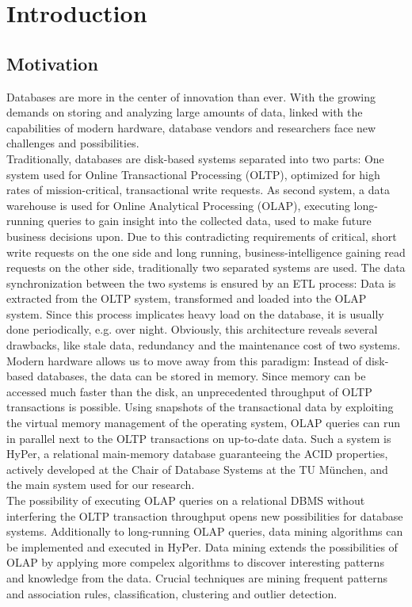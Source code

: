 \chapter{Introduction}\label{chapter:introduction}

\section{Motivation}


Databases are more in the center of innovation than ever. With the growing demands on storing and analyzing large amounts of data, linked with the capabilities of modern hardware, database vendors and researchers face new challenges and possibilities. 
\\
Traditionally, databases are disk-based systems separated into two parts: One system used for Online Transactional Processing (OLTP), optimized for high rates of mission-critical, transactional write requests. As second system, a data warehouse is used for Online Analytical Processing (OLAP), executing long-running queries to gain insight into the  collected data, used to make future business decisions upon. Due to this contradicting requirements of critical, short write requests on the one side and long running, business-intelligence gaining read requests on the other side, traditionally two separated systems are used. The data synchronization between the two systems is ensured by an ETL process: Data is extracted from the OLTP system, transformed and loaded into the OLAP system. Since this process implicates heavy load on the database, it is usually done periodically, e.g. over night. Obviously, this architecture reveals several drawbacks, like stale data, redundancy and the maintenance cost of two systems.
\\
Modern hardware allows us to move away from this paradigm: Instead of disk-based databases, the data can be stored in memory. Since memory can be accessed much faster than the disk, an unprecedented throughput of OLTP transactions is possible. Using snapshots of the transactional data by exploiting the virtual memory management of the operating system, OLAP queries can run in parallel next to the OLTP transactions on up-to-date data. Such a system is HyPer, a relational main-memory database guaranteeing the ACID properties, actively developed at the Chair of Database Systems at the TU München, and the main system used for our research. 
\\
The possibility of executing OLAP queries on a relational DBMS without interfering the OLTP transaction throughput opens new possibilities for database systems. Additionally to long-running OLAP queries, data mining algorithms can be implemented and executed in HyPer. Data mining extends the possibilities of OLAP by applying more compelex algorithms to discover interesting patterns and knowledge from the data. Crucial techniques are mining frequent patterns and association rules, classification, clustering and outlier detection.
